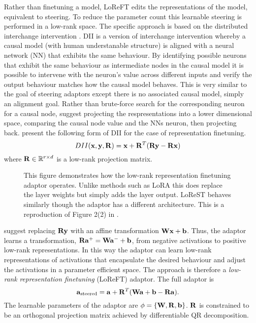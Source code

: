 Rather than finetuning a model, LoReFT edits the representations of the model, equivalent to steering.
To reduce the parameter count this learnable steering is performed in a low-rank space.
The specific approach is based on the distributed interchange intervention \citep[DII]{dii}.
DII is a version of interchange intervention whereby a causal model (with human understanable structure) is aligned with a neural network (NN) that exhibits the same behaviour.
By identifying possible neurons that exhibit the same behaviour as intermediate nodes in the causal model it is possible to intervene with the neuron's value across different inputs and verify the output behaviour matches how the causal model behaves.
This is very similar to the goal of steering adaptors except there is no associated causal model, simply an alignment goal.
Rather than brute-force search for the corresponding neuron for a causal node, \citet{dii} suggest projecting the respresentations into a lower dimensional space, comparing the causal node value and the NNs neuron, then projecting back.
\citet{reft} present the following form of DII for the case of representation finetuning.
\begin{equation*}
    DII(\mathbf{x},\mathbf{y},\mathbf{R}) = \mathbf{x} + \mathbf{R}^T(\mathbf{R}\mathbf{y} - \mathbf{R}\mathbf{x})
\end{equation*}
where $\mathbf{R} \in \mathbb{R}^{r\times d}$ is a low-rank projection matrix.

\begin{figure}
    \centering
    \captionsetup{width=.9\textwidth}
    
    \caption{This figure demonstrates how the low-rank representation finetuning adaptor \citep{reft} operates. Unlike methods such as LoRA \citep{lora} this does replace the layer weights but simply adds the layer output. LoReST \citep{steering-clear} behaves similarly though the adaptor has a different architecture. This is a reproduction of Figure 2(2) in \citet{reft}.}
     \label{fig:loreft}
\end{figure}

\citet{reft} suggest replacing $\mathbf{R}\mathbf{y}$ with an affine transformation $\mathbf{W}\mathbf{x} + \mathbf{b}$.
Thus, the adaptor learns a transformation, $\mathbf{R}\mathbf{a}^+ = \mathbf{W}\mathbf{a}^- + \mathbf{b}$, from negative activations to positive low-rank representations.
In this way the adaptor can learn low-rank representations of activations that encapsulate the desired behaviour and adjust the activations in a parameter efficient space.
The approach is therefore a \emph{low-rank representation finetuning} (LoReFT) adaptor.
The full adaptor is
\begin{equation}
    \label{eq:loreft}
    \mathbf{a}_\text{steered} = \mathbf{a} + \mathbf{R}^T(\mathbf{W}\mathbf{a} + \mathbf{b} - \mathbf{R}\mathbf{a}).
\end{equation}
The learnable parameters of the adaptor are $\phi = \{\mathbf{W}, \mathbf{R}, \mathbf{b}\}$.
$\mathbf{R}$ is constrained to be an orthogonal projection matrix achieved by differentiable QR decomposition.

